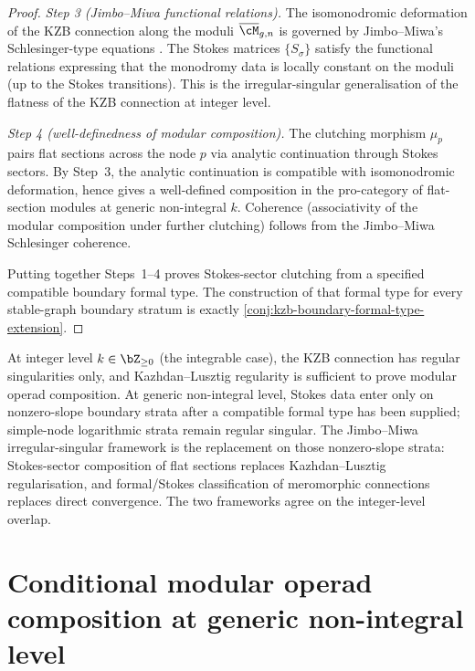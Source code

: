 \begin{proof}
\emph{Step 3 (Jimbo--Miwa functional relations).}
The isomonodromic deformation of the KZB connection along the
moduli \(\overline{\cM}_{g,n}\) is governed by Jimbo--Miwa's
Schlesinger-type equations
\cite{JMU81}. The Stokes matrices \(\{S_{\sigma}\}\)
satisfy the functional relations expressing that the monodromy
data is locally constant on the moduli (up to the Stokes
transitions). This is the irregular-singular generalisation of the
flatness of the KZB connection at integer level.

\emph{Step 4 (well-definedness of modular composition).}
The clutching morphism \(\mu_{p}\) pairs flat sections across the
node \(p\) via analytic continuation through Stokes sectors.
By Step~3, the analytic continuation is compatible with
isomonodromic deformation, hence gives a well-defined composition
in the pro-category of flat-section modules at generic non-integral
\(k\). Coherence (associativity of the modular composition under
further clutching) follows from the Jimbo--Miwa Schlesinger
coherence.

Putting together Steps~1--4 proves Stokes-sector clutching from a
specified compatible boundary formal type. The construction of
that formal type for every stable-graph boundary stratum is exactly
\autoref{conj:kzb-boundary-formal-type-extension}.
\end{proof}

\begin{remark}
\label{rem:integral-vs-irregular}
At integer level \(k \in \bZ_{\ge 0}\) (the integrable case), the
KZB connection has regular singularities only, and
Kazhdan--Lusztig regularity is sufficient to prove modular operad
composition. At generic non-integral level, Stokes data enter only
on nonzero-slope boundary strata after a compatible formal type has
been supplied; simple-node logarithmic strata remain regular
singular. The Jimbo--Miwa irregular-singular framework is the
replacement on those nonzero-slope strata: Stokes-sector composition
of flat sections replaces Kazhdan--Lusztig regularisation, and
formal/Stokes classification of meromorphic connections replaces
direct convergence. The two frameworks agree on the integer-level
overlap.
\end{remark}

\section{Conditional modular operad composition at generic non-integral level}
\label{sec:modular-op-composition}


